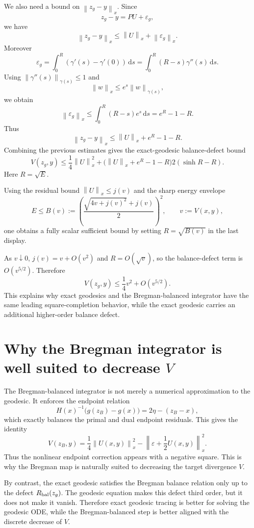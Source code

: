 \documentclass[11pt]{article}
\newcommand{\norm}[1]{\left\lVert #1\right\rVert}
\newcommand{\dd}{\mathrm d}
\begin{document}
We also need a bound on $\norm{z_g-y}_x$. Since
\[
    z_g-y=PU+\varepsilon_g,
\]
we have
\[
    \norm{z_g-y}_x\le \norm{U}_x+\norm{\varepsilon_g}_x.
\]
Moreover
\[
    \varepsilon_g=\int_0^R(\gamma'(s)-\gamma'(0))\,\dd s
    =\int_0^R(R-s)\gamma''(s)\,\dd s.
\]
Using $\norm{\gamma''(s)}_{\gamma(s)}\le 1$ and
\[
    \norm{w}_x\le e^s\norm{w}_{\gamma(s)},
\]
we obtain
\[
    \norm{\varepsilon_g}_x
    \le
    \int_0^R(R-s)e^s\,\dd s
    =e^R-1-R.
\]
Thus
\[
    \boxed{
    \norm{z_g-y}_x
    \le
    \norm{U}_x+e^R-1-R.
    }
\]
Combining the previous estimates gives the exact-geodesic balance-defect bound
\[
    \boxed{
    V(z_g,y)
    \le
    \frac14\norm{U}_x^2
    +
    \bigl(\norm{U}_x+e^R-1-R\bigr)
    2(\sinh R-R).
    }
\]
Here $R=\sqrt E$.

Using the residual bound $\norm{U}_x\le j(v)$ and the sharp energy envelope
\[
    E\le B(v):=
    \left(
    \frac{\sqrt{4v+j(v)^2}+j(v)}{2}
    \right)^2,
    \qquad v:=V(x,y),
\]
one obtains a fully scalar sufficient bound by setting $R=\sqrt{B(v)}$ in the last display.

As $v\downarrow0$, $j(v)=v+O(v^2)$ and $R=O(\sqrt v)$, so the balance-defect term is $O(v^{5/2})$. Therefore
\[
    V(z_g,y)
    \le
    \frac14v^2+O(v^{5/2}).
\]
This explains why exact geodesics and the Bregman-balanced integrator have the same leading square-completion behavior, while the exact geodesic carries an additional higher-order balance defect.

\section{Why the Bregman integrator is well suited to decrease $V$}

The Bregman-balanced integrator is not merely a numerical approximation to the geodesic. It enforces the endpoint relation
\[
    H(x)^{-1}\bigl(g(z_B)-g(x)\bigr)=2\eta-(z_B-x),
\]
which exactly balances the primal and dual endpoint residuals. This gives the identity
\[
    V(z_B,y)
    =
    \frac14\norm{U(x,y)}_x^2
    -
    \left\|\varepsilon+\frac12U(x,y)\right\|_x^2.
\]
Thus the nonlinear endpoint correction appears with a negative square. This is why the Bregman map is naturally suited to decreasing the target divergence $V$.

By contrast, the exact geodesic satisfies the Bregman balance relation only up to the defect $R_{\rm bal}(z_g)$. The geodesic equation makes this defect third order, but it does not make it vanish. Therefore exact geodesic tracing is better for solving the geodesic ODE, while the Bregman-balanced step is better aligned with the discrete decrease of $V$.
\end{document}
